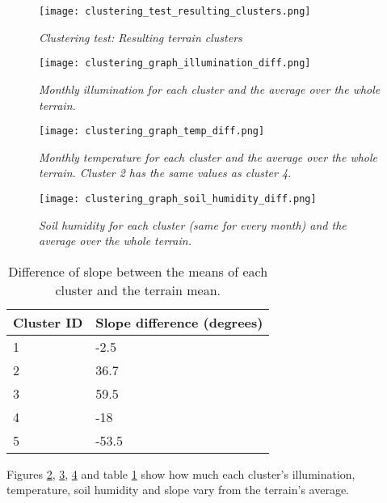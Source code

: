 \begin{figure}
\center
	\texttt{[image: clustering\_test\_resulting\_clusters.png]}
	\caption{ \textit{Clustering test: Resulting terrain clusters}}	
	\label{fig:clustering_test_resulting_clusters}
\end{figure}

\begin{figure}
\center
	\texttt{[image: clustering\_graph\_illumination\_diff.png]}
	\caption{ \textit{Monthly illumination for each cluster and the average over the whole terrain.}}	
	\label{fig:clustering_graph_illumination}
\end{figure}

\begin{figure}
\center
	\texttt{[image: clustering\_graph\_temp\_diff.png]}
	\caption{ \textit{Monthly temperature for each cluster and the average over the whole terrain. Cluster 2 has the same values as cluster 4.}}	
	\label{fig:clustering_graph_temp}
\end{figure}

\begin{figure}
\center
	\texttt{[image: clustering\_graph\_soil\_humidity\_diff.png]}
	\caption{ \textit{Soil humidity for each cluster (same for every month) and the average over the whole terrain.}}	
	\label{fig:clustering_graph_humidity}
\end{figure}

\begin{table}[]
  \centering
	\begin{tabular}{|p{5cm}|p{5cm}|}
	\hline
	\textbf{Cluster ID} & \textbf{Slope difference (degrees)}\\
	\hline
	1 & -2.5 \\	
	\hline
	2 & 36.7\\	
	\hline
	3 & 59.5\\	
	\hline
	4 & -18\\	
	\hline
	5 & -53.5\\		
	\hline
	\end{tabular}
	\caption{ Difference of slope between the means of each cluster and the terrain mean.}
	\label{tab:clustering_slope_mean}
\end{table}

Figures \ref{fig:clustering_graph_illumination}, \ref{fig:clustering_graph_temp}, \ref{fig:clustering_graph_humidity} and table \ref{tab:clustering_slope_mean} show how much each cluster's illumination, temperature, soil humidity and slope vary from the terrain's average.\\ 

